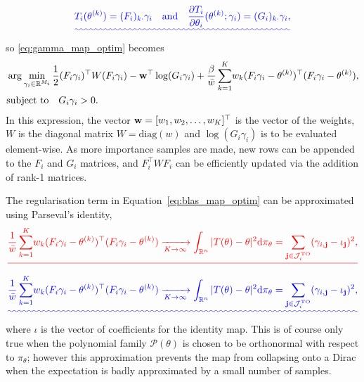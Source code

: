 \documentclass[final]{siamltex}
\providecommand{\DIFadd}[1]{{\protect\color{blue}\uwave{#1}}} %
\providecommand{\DIFdel}[1]{{\protect\color{red}\sout{#1}}}                      %
\providecommand{\DIFaddbegin}{} %
\providecommand{\DIFaddend}{} %
\providecommand{\DIFdelbegin}{} %
\providecommand{\DIFdelend}{} %
\newcommand{\DIFscaledelfig}{0.5}
\newlength{\DIFdelgraphicswidth} %
\newlength{\DIFdelgraphicsheight} %
\newcommand{\DIFaddincludegraphics}[2][]{{\color{blue}\fbox{\DIFOincludegraphics[#1]{#2}}}} %
\newcommand{\DIFdelincludegraphics}[2][]{%
\sbox{\DIFdelgraphicsbox}{\DIFOincludegraphics[#1]{#2}}%
\settoboxwidth{\DIFdelgraphicswidth}{\DIFdelgraphicsbox} %
\settoboxtotalheight{\DIFdelgraphicsheight}{\DIFdelgraphicsbox} %
\scalebox{\DIFscaledelfig}{%
\parbox[b]{\DIFdelgraphicswidth}{\usebox{\DIFdelgraphicsbox}\\[-\baselineskip] \rule{\DIFdelgraphicswidth}{0em}}\llap{\resizebox{\DIFdelgraphicswidth}{\DIFdelgraphicsheight}{%
\setlength{\unitlength}{\DIFdelgraphicswidth}%
\begin{picture}(1,1)%
\thicklines\linethickness{2pt} %
{\color[rgb]{1,0,0}\put(0,0){\framebox(1,1){}}}%
{\color[rgb]{1,0,0}\put(0,0){\line( 1,1){1}}}%
{\color[rgb]{1,0,0}\put(0,1){\line(1,-1){1}}}%
\end{picture}%
}\hspace*{3pt}}} %
} %
\DeclareRobustCommand{\DIFaddbegin}{\DIFOaddbegin \let\includegraphics\DIFaddincludegraphics} %
\DeclareRobustCommand{\DIFaddend}{\DIFOaddend \let\includegraphics\DIFOincludegraphics} %
\DeclareRobustCommand{\DIFdelbegin}{\DIFOdelbegin \let\includegraphics\DIFdelincludegraphics} %
\DeclareRobustCommand{\DIFdelend}{\DIFOaddend \let\includegraphics\DIFOincludegraphics} %
\begin{document}
\DIFdelend \DIFaddbegin \begin{equation}
	\DIFadd{T_i(\theta^{(k)}) = (F_i)_{k\cdot}\gamma_i \quad \text{and} \quad \frac{\partial T_i}{\partial \theta_i}(\theta^{(k)}; \gamma_i) = (G_i)_{k\cdot}\gamma_i,
}\end{equation}
\DIFaddend so \eqref{eq:gamma_map_optim} becomes
\begin{align}\label{eq:blas_map_optim}
	&\arg\min_{\gamma_i\in\mathbb{R}^{M_i}}
          \frac{1}{2}(F_i\gamma_i)^\top W (F_i\gamma_i) -
		{\bf w}^\top\log(G_i\gamma_i) + \frac{\beta}{\bar{w}}\sum\limits_{k=1}^K \!
		w_k(F_i\gamma_i-\theta^{(k)})^\top(F_i\gamma_i-\theta^{(k)}), \\
	&\text{subject to} \quad G_i\gamma_i > 0. \notag
\end{align}
In this expression, the vector ${\bf w} = [w_1, w_2, \ldots,
w_K]^\top$ is the vector of the weights, $W$ is the diagonal matrix $W
= \text{diag}(w)$ and $\log(G_i\gamma_i)$ is to be
evaluated element-wise. As more importance samples are made, new rows can be appended to the
$F_i$ and $G_i$ matrices, and $F_i^\top W F_i$ can be efficiently updated via the addition of rank-1 matrices.

The regularisation term in Equation~\eqref{eq:blas_map_optim} can be approximated using Parseval's identity,
\DIFdelbegin \[
	\DIFdel{\frac{1}{\bar{w}}\sum\limits_{k=1}^K \! w_k
        (F_i\gamma_i-\theta^{(k)})^\top(F_i\gamma_i-\theta^{(k)})
        \xrightarrow[K \to \infty]{}
		\int_{\mathbb{R}^n} |T(\theta)-\theta|^2 \text{d}\pi_\theta =
		\sum\limits_{\mathbf{j}\in\mathcal{J}_i^\text{TO}} (\gamma_{i,\mathbf{j}}-\iota_\mathbf{j})^2,
}\]
\DIFdelend \DIFaddbegin \begin{equation}
	\DIFadd{\frac{1}{\bar{w}}\sum\limits_{k=1}^K \! w_k
        (F_i\gamma_i-\theta^{(k)})^\top(F_i\gamma_i-\theta^{(k)})
        \xrightarrow[K \to \infty]{}
		\int_{\mathbb{R}^n} |T(\theta)-\theta|^2 \text{d}\pi_\theta =
		\sum\limits_{\mathbf{j}\in\mathcal{J}_i^\text{TO}} (\gamma_{i,\mathbf{j}}-\iota_\mathbf{j})^2,
}\end{equation}
\DIFaddend where $\iota$ is the vector of coefficients for the identity map. This is of course only true when
the polynomial family $\mathcal{P}(\theta)$ is chosen to be orthonormal with respect to $\pi_\theta$; however this
approximation prevents the map from collapsing onto a Dirac when the expectation is badly approximated by a small number of samples.%
\end{document}
